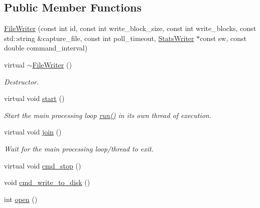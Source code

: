 \subsection*{Public Member Functions}
\begin{DoxyCompactItemize}
\item 
\hyperlink{class_file_writer_ae35a8819039ac43d6d1bc6448bf5d9ca}{FileWriter} (const int id, const int write\_\-block\_\-size, const int write\_\-blocks, const std::string \&capture\_\-file, const int poll\_\-timeout, \hyperlink{class_stats_writer}{StatsWriter} $\ast$const sw, const double command\_\-interval)
\item 
\hypertarget{class_file_writer_ae5490307dcaf9237f4c1b8b8df433e03}{
virtual \hyperlink{class_file_writer_ae5490307dcaf9237f4c1b8b8df433e03}{$\sim$FileWriter} ()}
\label{class_file_writer_ae5490307dcaf9237f4c1b8b8df433e03}

\begin{DoxyCompactList}\small\item\em Destructor. \end{DoxyCompactList}\item 
\hypertarget{class_file_writer_a49837b1a8ddfa509932e66830327c92f}{
virtual void \hyperlink{class_file_writer_a49837b1a8ddfa509932e66830327c92f}{start} ()}
\label{class_file_writer_a49837b1a8ddfa509932e66830327c92f}

\begin{DoxyCompactList}\small\item\em Start the main processing loop \hyperlink{class_file_writer_adef323aa1b01c54dcdf26a7c67ba0360}{run()} in its own thread of execution. \end{DoxyCompactList}\item 
\hypertarget{class_file_writer_add364eb1a603167a70713eb87d90ee52}{
virtual void \hyperlink{class_file_writer_add364eb1a603167a70713eb87d90ee52}{join} ()}
\label{class_file_writer_add364eb1a603167a70713eb87d90ee52}

\begin{DoxyCompactList}\small\item\em Wait for the main processing loop/thread to exit. \end{DoxyCompactList}\item 
virtual void \hyperlink{class_file_writer_ad0a98ab099aaca2f64875ace82fadd55}{cmd\_\-stop} ()
\item 
void \hyperlink{class_file_writer_a54470d110cd9e50add4a18808ef162cf}{cmd\_\-write\_\-to\_\-disk} ()
\item 
\hypertarget{class_file_writer_a3cb740ffb3e76673dd5b8f2f02364814}{
int \hyperlink{class_file_writer_a3cb740ffb3e76673dd5b8f2f02364814}{open} ()}
\label{class_file_writer_a3cb740ffb3e76673dd5b8f2f02364814}


\end{DoxyCompactItemize}
